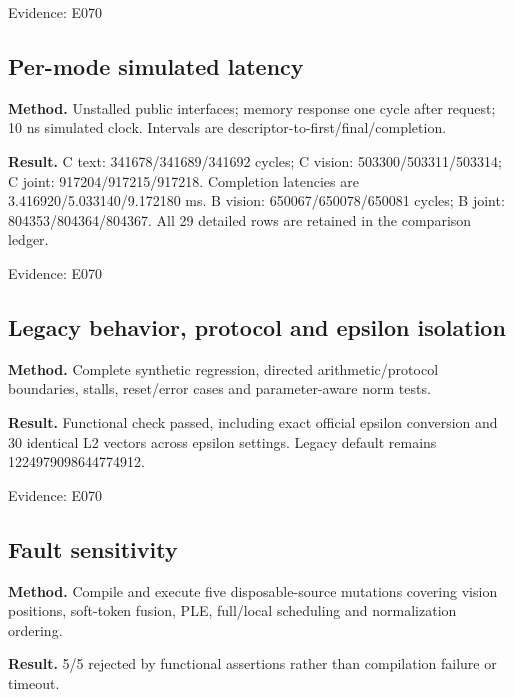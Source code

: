\documentclass[11pt,a4paper]{article}
\begin{document}
{\small Evidence: E070}

\subsection{Per-mode simulated latency}

\textbf{Method.} Unstalled public interfaces; memory response one cycle after request; 10 ns simulated clock. Intervals are descriptor-to-first/\allowbreak{}final/\allowbreak{}completion.

\textbf{Result.} C text: 341678/\allowbreak{}341689/\allowbreak{}341692 cycles; C vision: 503300/\allowbreak{}503311/\allowbreak{}503314; C joint: 917204/\allowbreak{}917215/\allowbreak{}917218. Completion latencies are 3.416920/\allowbreak{}5.033140/\allowbreak{}9.172180 ms. B vision: 650067/\allowbreak{}650078/\allowbreak{}650081 cycles; B joint: 804353/\allowbreak{}804364/\allowbreak{}804367. All 29 detailed rows are retained in the comparison ledger.

{\small Evidence: E070}

\subsection{Legacy behavior,\allowbreak{} protocol and epsilon isolation}

\textbf{Method.} Complete synthetic regression,\allowbreak{} directed arithmetic/\allowbreak{}protocol boundaries,\allowbreak{} stalls,\allowbreak{} reset/\allowbreak{}error cases and parameter-aware norm tests.

\textbf{Result.} Functional check passed,\allowbreak{} including exact official epsilon conversion and 30 identical L2 vectors across epsilon settings. Legacy default remains 1224979098644774912.

{\small Evidence: E070}

\subsection{Fault sensitivity}

\textbf{Method.} Compile and execute five disposable-source mutations covering vision positions,\allowbreak{} soft-token fusion,\allowbreak{} PLE,\allowbreak{} full/\allowbreak{}local scheduling and normalization ordering.

\textbf{Result.} 5/\allowbreak{}5 rejected by functional assertions rather than compilation failure or timeout.
\end{document}
